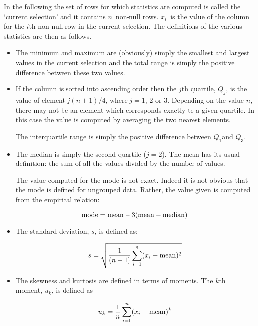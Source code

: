 \documentclass[twoside,11pt]{starlink}
\begin{document}
In the following the set of rows for which statistics are computed is
called the `current selection' and it contains $n$\, non-null rows.
$x_{i}$\, is the value of the column for the $i$th non-null row in the
current selection.  The definitions of the various statistics are then as
follows.

\begin{itemize}

  \item The minimum and maximum are (obviously) simply the smallest and
   largest values in the current selection and the total range is simply
   the positive difference between these two values.

  \item If the column is sorted into ascending order then the $j$th quartile,
   $Q_{j}$, is the value of element $j(n + 1)/4$, where $j = 1$, 2 or 3.
   Depending on the value $n$, there may not be an element which
   corresponds exactly to a given quartile.  In this case the value is
   computed by averaging the two nearest elements.

   The interquartile range is simply the positive difference between
   $Q_{1}$and $Q_{3}$.

  \item The median is simply the second quartile ($j = 2$).  The mean has
   its usual definition: the sum of all the values divided by the number
   of values.

   The value computed for the mode is not exact.  Indeed it is not
   obvious that the mode is defined for ungrouped data.  Rather, the value
   given is computed from the empirical relation:

  \begin{equation}
   {\rm mode} = {\rm mean} - 3({\rm mean} - {\rm median})
  \end{equation}

  \item The standard deviation, $s$, is defined as:


  \begin{equation}
   s = \sqrt{ \frac{1}{(n - 1)} \sum_{i=1}^{n} (x_{i} - {\rm mean})^2 }
  \end{equation}

  \item The skewness and kurtosis are defined in terms of moments.  The
   $k$th moment, $u_{k}$, is defined as

  \begin{equation}
   u_{k} = \frac{1}{n} \sum_{i=1}^{n} (x_{i} - {\rm mean})^{k}
  \end{equation}


\end{itemize}
\end{document}
